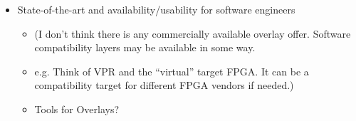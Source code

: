 \begin{raggedleft}
\begin{itemize}[nosep]
\item
State-of-the-art and availability/usability for software engineers
\begin{itemize}[nosep]
\item (I don’t think there is any commercially available overlay offer.  Software compatibility layers may be available in some way.
\item e.g. Think of VPR and the “virtual” target FPGA. It can be a compatibility target for different FPGA vendors if needed.)
\item Tools for Overlays?
\end{itemize}
\end{itemize}

\end{raggedleft}
